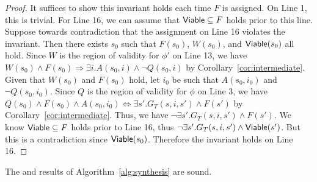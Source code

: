 \begin{proof}
  It suffices to show this invariant holds each time $F$ is assigned.
  On Line 1, this is trivial. For Line 16, we can assume that
  ${\mathsf {Viable}} \subseteq F$ holds prior to this line. Suppose towards
  contradiction that the assignment on Line 16 violates the invariant.
  Then there exists $s_0$ such that $F(s_0)$, $W(s_0)$, and
  ${\mathsf {Viable}}(s_0)$ all hold. Since $W$ is the region of validity for
  $\phi'$ on Line 13, we have
  $W(s_0) \land F(s_0) \Rightarrow \exists i. A(s_0, i) \land \neg Q(s_0, i)$
  by Corollary~\ref{cor:intermediate}. Given that $W(s_0)$ and $F(s_0)$ hold, let $i_0$
  be such that $A(s_0, i_0)$ and $\neg Q(s_0, i_0)$. Since $Q$ is the
  region of validity for $\phi$ on Line 3, we have
  $Q(s_0) \land F(s_0) \land A(s_0, i_0) \Leftrightarrow \exists s'. G_T(s, i, s')
  \land F(s')$ by Corollary~\ref{cor:intermediate}. Thus, we have
  $\neg \exists s'. G_T(s, i, s') \land F(s')$. We know
  ${\mathsf {Viable}} \subseteq F$ holds prior to Line 16, thus
  $\neg \exists s'. G_T(s, i, s') \land {\mathsf {Viable}}(s')$. But this is a
  contradiction since ${\mathsf {Viable}}(s_0)$. Therefore the invariant holds on
  Line 16.
\end{proof}


\begin{theorem}
  The \realizable and \unrealizable results of
  Algorithm~\ref{alg:synthesis} are sound.
\end{theorem}


